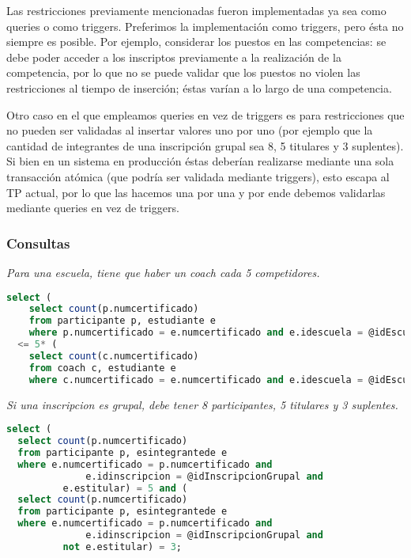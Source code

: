 \par Las restricciones previamente mencionadas fueron implementadas ya sea como queries o como triggers.
Preferimos la implementación como triggers, pero ésta no siempre es posible.
Por ejemplo, considerar los puestos en las competencias: se debe poder acceder a los inscriptos previamente a la realización de la competencia, por lo que no se puede validar que los puestos no violen las restricciones al tiempo de inserción; éstas varían a lo largo de una competencia.

\par Otro caso en el que empleamos queries en vez de triggers es para restricciones que no pueden ser validadas al insertar valores uno por uno (por ejemplo que la cantidad de integrantes de una inscripción grupal sea 8, 5 titulares y 3 suplentes).
Si bien en un sistema en producción éstas deberían realizarse mediante una sola transacción atómica (que podría ser validada mediante triggers), esto escapa al TP actual, por lo que las hacemos una por una y por ende debemos validarlas mediante queries en vez de triggers.


\subsubsection{Consultas}
\emph{Para una escuela, tiene que haber un coach cada 5 competidores.}

\begin{lstlisting}[language=SQL]
select (
    select count(p.numcertificado)
    from participante p, estudiante e
    where p.numcertificado = e.numcertificado and e.idescuela = @idEscuela)
  <= 5* (
    select count(c.numcertificado)
    from coach c, estudiante e
    where c.numcertificado = e.numcertificado and e.idescuela = @idEscuela);
\end{lstlisting}

\emph{Si una inscripcion es grupal, debe tener 8 participantes, 5 titulares y 3 suplentes.}

\begin{lstlisting}[language=SQL]
select (
  select count(p.numcertificado)
  from participante p, esintegrantede e
  where e.numcertificado = p.numcertificado and
              e.idinscripcion = @idInscripcionGrupal and
	      e.estitular) = 5 and (
  select count(p.numcertificado)
  from participante p, esintegrantede e
  where e.numcertificado = p.numcertificado and
              e.idinscripcion = @idInscripcionGrupal and
	      not e.estitular) = 3;
\end{lstlisting}

